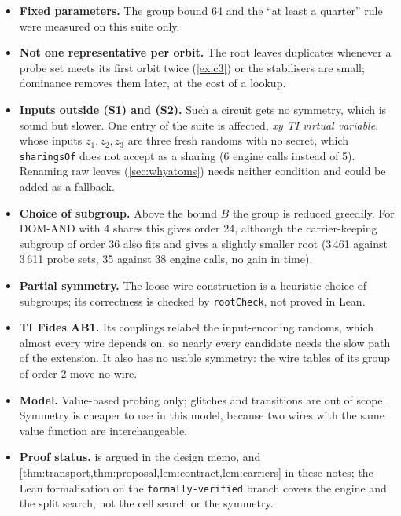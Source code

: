 \documentclass[11pt,a4paper]{article}
\theoremstyle{definition}
\theoremstyle{remark}
\newcommand{\code}[1]{\texttt{\small #1}}
\begin{document}
\begin{itemize}[leftmargin=*]
\item \textbf{Fixed parameters.}  The group bound 64 and the ``at least a quarter'' rule were
  measured on this suite only.
\item \textbf{Not one representative per orbit.}  The root leaves duplicates whenever a
  probe set meets its first orbit twice (\cref{ex:c3}) or the stabilisers are small; dominance
  removes them later, at the cost of a lookup.
\item \textbf{Inputs outside (S1) and (S2).}  Such a circuit gets no symmetry, which is sound but
  slower.  One entry of the suite is affected, \emph{xy TI virtual variable}, whose inputs
  $z_1,z_2,z_3$ are three fresh randoms with no secret, which \code{sharingsOf} does not accept as
  a sharing (6 engine calls instead of 5).  Renaming raw leaves (\cref{sec:whyatoms}) needs neither
  condition and could be added as a fallback.
\item \textbf{Choice of subgroup.}  Above the bound $B$ the group is reduced greedily.  For DOM-AND
  with 4 shares this gives order 24, although the carrier-keeping subgroup of order 36 also fits
  and gives a slightly smaller root (3\,461 against 3\,611 probe sets, 35 against 38 engine calls,
  no gain in time).
\item \textbf{Partial symmetry.}  The loose-wire construction is a heuristic choice of
  subgroups; its correctness is checked by \code{rootCheck}, not proved in Lean.
\item \textbf{TI Fides AB1.}  Its couplings relabel the input-encoding randoms, which almost
  every wire depends on, so nearly every candidate needs the slow path of the extension.  It also
  has no usable symmetry: the wire tables of its group of order 2 move no wire.
\item \textbf{Model.}  Value-based probing only; glitches and transitions are out of scope.
  Symmetry is cheaper to use in this model, because two wires with the same value function are
  interchangeable.
\item \textbf{Proof status.}   is argued in the design memo,
  and \cref{thm:transport,thm:proposal,lem:contract,lem:carriers} in these notes;
  the Lean formalisation on the \code{formally-verified} branch covers the engine and the
  split search, not the cell search or the symmetry.
\end{itemize}
\end{document}
